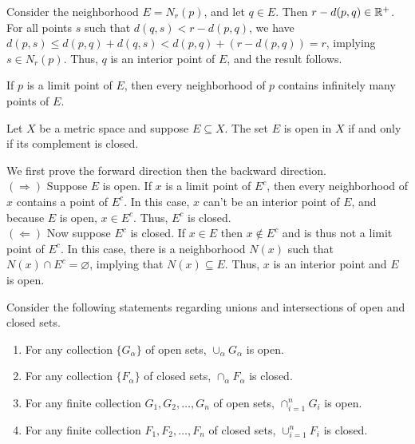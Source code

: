 \documentclass{mathnotes}
\begin{document}
\begin{pf}
  Consider the neighborhood $E=N_r(p)$, and let $q\in E$. Then
  $r-d(p,q)\in\mathbb{R}^+$. For all points $s$ such that $d(q,s)<r-d(p,q)$, we have
  $d(p,s)\le d(p,q)+d(q,s)<d(p,q)+(r-d(p,q))=r$, implying $s\in N_r(p)$. Thus,
  $q$ is an interior point of $E$, and the result follows.
\end{pf}

\begin{prop}
  If $p$ is a limit point of $E$, then every neighborhood of $p$ contains
  infinitely many points of $E$.
\end{prop}

\begin{prop}
  Let $X$ be a metric space and suppose $E\subseteq X$. The set $E$ is open in
  $X$ if and only if its complement is closed.
\end{prop}

\begin{pf}
  We first prove the forward direction then the backward direction.\\
  $(\Rightarrow)$ Suppose $E$ is open. If $x$ is a limit point of $E^c$, then
  every neighborhood of $x$ contains a point of $E^c$. In this case, $x$ can't
  be an interior point of $E$, and because $E$ is open, $x\in E^c$. Thus, $E^c$
  is closed.\\
  $(\Leftarrow)$ Now suppose $E^c$ is closed. If $x\in E$ then $x\notin E^c$
  and is thus not a limit point of $E^c$. In this case, there is a neighborhood
  $N(x)$ such that $N(x)\cap E^c=\varnothing$, implying that $N(x)\subseteq E$.
  Thus, $x$ is an interior point and $E$ is open.
\end{pf}

\begin{thm}
  Consider the following statements regarding unions and intersections of open
  and closed sets.
  \begin{enumerate}
    \item For any collection $\{G_\alpha\}$ of open sets, $\cup_\alpha
      G_\alpha$ is open.
    \item For any collection $\{F_\alpha\}$ of closed sets, $\cap_\alpha
      F_\alpha$ is closed.
    \item For any finite collection $G_1,G_2,\ldots,G_n$ of open sets,
      $\cap_{i=1}^nG_i$ is open.
    \item For any finite collection $F_1,F_2,\ldots,F_n$ of closed sets,
      $\cup_{i=1}^nF_i$ is closed.
  \end{enumerate}
\end{thm}
\end{document}
